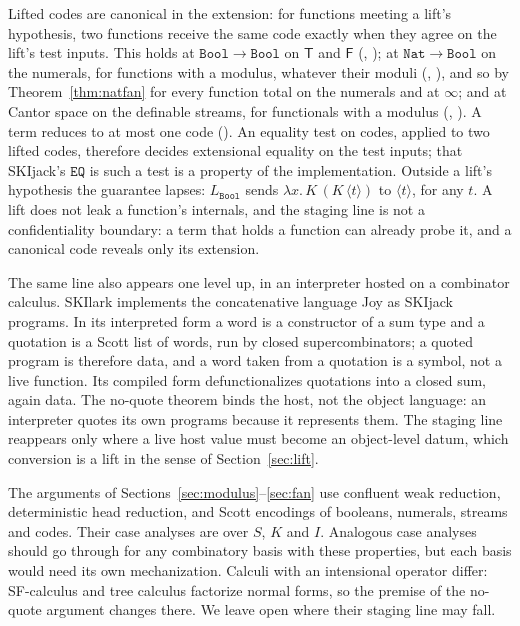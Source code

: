 \documentclass[acmsmall,review,screen]{acmart}\def\acmclass{}
\theoremstyle{plain}
\theoremstyle{definition}
\theoremstyle{remark}
\newcommand{\code}[1]{\langle #1\rangle}
\newcommand{\T}{\mathsf{T}}
\newcommand{\F}{\mathsf{F}}
\newcommand{\Nat}{\mathtt{Nat}}
\newcommand{\Bool}{\mathtt{Bool}}
\begin{document}
Lifted codes are canonical in the extension: for functions meeting a lift's hypothesis,
two functions receive the same code exactly when they agree on the lift's test inputs.
This holds at $\Bool\to\Bool$ on $\T$ and $\F$ (,
); at $\Nat\to\Bool$ on the numerals, for functions with a
modulus, whatever their moduli (,
), and so by Theorem~\ref{thm:natfan} for every function total
on the numerals and at $\infty$; and at Cantor space on the definable streams, for
functionals with a modulus (,
).  A term reduces to at most one code
().  An equality test on codes, applied to two lifted codes,
therefore decides extensional equality on the test inputs; that SKIjack's $\mathtt{EQ}$
is such a test is a property of the implementation.  Outside a lift's hypothesis the
guarantee lapses: $L_\Bool$ sends $\lambda x.\,K\,(K\,\code{t})$ to $\code{t}$, for any
$t$.  A lift does not leak a function's internals, and the staging line is not a
confidentiality boundary: a term that holds a function can already probe it, and a
canonical code reveals only its extension.

The same line also appears one level up, in an interpreter hosted on a combinator calculus.
SKIlark \citep{skilark} implements the concatenative language Joy \citep{vonThunThomas2001}
as SKIjack programs.  In its interpreted form a word is a constructor of a sum type and a
quotation is a Scott list of words, run by closed supercombinators; a quoted program is
therefore data, and a word taken from a quotation is a symbol, not a live function.  Its
compiled form defunctionalizes quotations into a closed sum, again data.  The no-quote theorem binds the host, not the object language: an
interpreter quotes its own programs because it represents them.  The staging line
reappears only where a live host value must become an object-level datum, which
conversion is a lift in the sense of Section~\ref{sec:lift}.

The arguments of Sections~\ref{sec:modulus}--\ref{sec:fan} use confluent weak reduction,
deterministic head reduction, and Scott encodings of booleans, numerals, streams and
codes.  Their case analyses are over $S$, $K$ and $I$.  Analogous case analyses should go
through for any combinatory basis with these properties, but each basis would need its own
mechanization.  Calculi with an intensional operator differ: SF-calculus and tree
calculus \citep{JayGivenWilson2011,Jay2021} factorize normal forms, so the premise of
the no-quote argument changes there.  We leave open where their staging line may fall.
\end{document}
